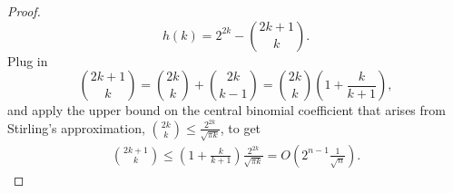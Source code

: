 \documentclass[10pt,a4paper]{amsart}
\renewcommand{\leq}{\leqslant}
\begin{document}
\begin{proof}
\[ h(k) = 2^{2k} - \binom{2k+1}{k} .\]
Plug in
\[ \binom{2k+1}{k} = \binom{2k}{k} + \binom{2k}{k-1} = \binom{2k}{k} \left(1 + \frac{k}{k+1}\right),\]
and apply the upper bound on the central binomial coefficient that arises from Stirling's approximation,
\( \binom{2k}{k} \leq \frac{2^{2k}}{\sqrt{\pi k}}\),
to get
\begin{align*}
\binom{2k+1}{k} \leq \left(1 + \frac{k}{k+1}\right)\frac{2^{2k}}{\sqrt{\pi k}} =
O \left( 2^{n-1} \frac{1}{\sqrt{n}} \right).
\end{align*}

\end{proof}
\end{document}
